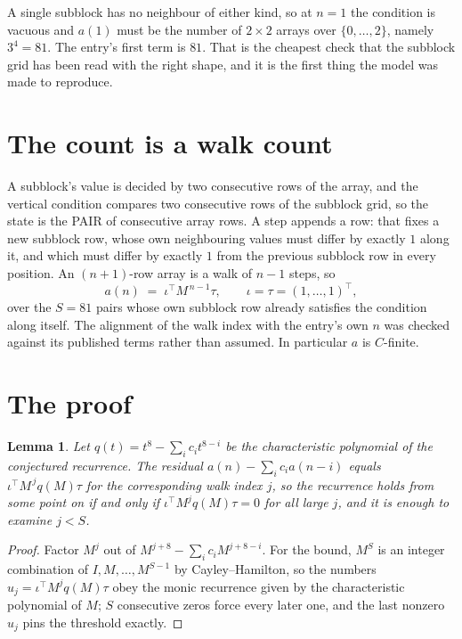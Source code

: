 \documentclass[11pt,a4paper]{article}
\theoremstyle{plain}
\newtheorem{lemma}[theorem]{Lemma}
\theoremstyle{definition}
\begin{document}
A single subblock has no neighbour of either kind, so at $n=1$ the condition is vacuous and
$a(1)$ must be the number of $2\times2$ arrays over $\{0,\dots,2\}$, namely
$3^{4}=81$. The entry's first term is $81$.
That is the cheapest check that the subblock grid has been read with the right shape, and it
is the first thing the model was made to reproduce.

\section{The count is a walk count}

A subblock's value is decided by two consecutive rows of the array, and the
vertical condition compares two consecutive rows of the subblock grid, so the state is the
PAIR of consecutive array rows. A step appends a row: that fixes a new subblock row, whose own
neighbouring values must differ by exactly $1$ along it, and which must differ by exactly
$1$ from the previous subblock row in every position. An $(n+1)$-row array is a walk of
$n-1$ steps, so
\[
a(n)\;=\;\iota^{\!\top}M^{\,n-1}\tau,\qquad\iota=\tau=(1,\dots,1)^{\!\top},
\]
over the $S=81$ pairs whose own subblock row already satisfies the condition along itself.
The alignment of the walk index with the entry's own $n$ was checked against its published
terms rather than assumed. In particular $a$ is $C$-finite.

\section{The proof}

\begin{lemma}\label{lem:crit}
Let $q(t)=t^{8}-\sum_i c_it^{8-i}$ be the characteristic polynomial of the
conjectured recurrence. The residual $a(n)-\sum_ic_ia(n-i)$ equals
$\iota^{\!\top}M^{\,j}q(M)\tau$ for the corresponding walk index $j$, so the recurrence
holds from some point on if and only if $\iota^{\!\top}M^{j}q(M)\tau=0$ for all large $j$,
and it is enough to examine $j<S$.
\end{lemma}

\begin{proof}
Factor $M^{j}$ out of $M^{j+8}-\sum_ic_iM^{j+8-i}$. For the bound, $M^{S}$
is an integer combination of $I,M,\dots,M^{S-1}$ by Cayley--Hamilton, so the numbers
$u_j=\iota^{\!\top}M^{j}q(M)\tau$ obey the monic recurrence given by the characteristic
polynomial of $M$; $S$ consecutive zeros force every later one, and the last nonzero $u_j$
pins the threshold exactly.
\end{proof}
\end{document}

